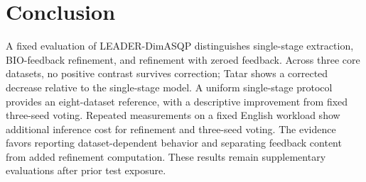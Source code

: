 \documentclass[conference]{IEEEtran}
\begin{document}
\section{Conclusion}
A fixed evaluation of LEADER-DimASQP distinguishes single-stage extraction, BIO-feedback refinement, and refinement with zeroed feedback. Across three core datasets, no positive contrast survives correction; Tatar shows a corrected decrease relative to the single-stage model. A uniform single-stage protocol provides an eight-dataset reference, with a descriptive improvement from fixed three-seed voting. Repeated measurements on a fixed English workload show additional inference cost for refinement and three-seed voting. The evidence favors reporting dataset-dependent behavior and separating feedback content from added refinement computation. These results remain supplementary evaluations after prior test exposure.
\end{document}
